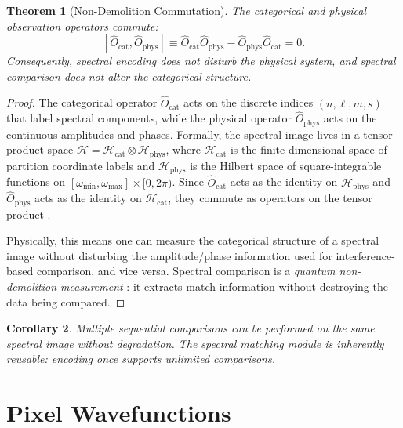 \documentclass[11pt,twocolumn,a4paper]{article}
\newtheorem{theorem}{Theorem}[section]
\newtheorem{corollary}[theorem]{Corollary}
\newcommand{\Ocat}{\hat{O}_{\mathrm{cat}}}
\newcommand{\Ophys}{\hat{O}_{\mathrm{phys}}}
\newcommand{\Hilb}{\mathcal{H}}
\begin{document}
\begin{theorem}[Non-Demolition Commutation]
\label{thm:commutation}
The categorical and physical observation operators commute:
\begin{equation}
\label{eq:commutation}
  [\Ocat, \Ophys] \equiv \Ocat \Ophys - \Ophys \Ocat = 0.
\end{equation}
Consequently, spectral encoding does not disturb the physical system,
and spectral comparison does not alter the categorical structure.
\end{theorem}

\begin{proof}
The categorical operator $\Ocat$ acts on the discrete indices
$(n, \ell, m, s)$ that label spectral components, while the physical
operator $\Ophys$ acts on the continuous amplitudes and phases.
Formally, the spectral image lives in a tensor product space
$\Hilb = \Hilb_{\text{cat}} \otimes \Hilb_{\text{phys}}$, where
$\Hilb_{\text{cat}}$ is the finite-dimensional space of partition
coordinate labels and $\Hilb_{\text{phys}}$ is the Hilbert space of
square-integrable functions on $[\omega_{\min}, \omega_{\max}] \times
[0, 2\pi)$. Since $\Ocat$ acts as the identity on $\Hilb_{\text{phys}}$
and $\Ophys$ acts as the identity on $\Hilb_{\text{cat}}$, they commute
as operators on the tensor product \citep{vonneumann1932, sakurai2017}.

Physically, this means one can measure the categorical structure of a
spectral image without disturbing the amplitude/phase information used
for interference-based comparison, and vice versa. Spectral comparison
is a \emph{quantum non-demolition measurement} \citep{braginsky1980}:
it extracts match information without destroying the data being compared.
\end{proof}

\begin{corollary}
\label{cor:non_demolition}
Multiple sequential comparisons can be performed on the same spectral
image without degradation. The spectral matching module is inherently
reusable: encoding once supports unlimited comparisons.
\end{corollary}



\section{Pixel Wavefunctions}
\label{sec:pixel_wavefunctions}
\end{document}
